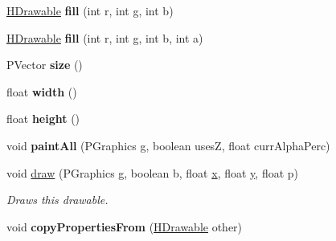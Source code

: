 \begin{DoxyCompactItemize}
\item 
\hypertarget{classhype_1_1drawable_1_1_h_stage_a55c66dfd278df300fcb6c96988dbb4da}{\hyperlink{classhype_1_1drawable_1_1_h_drawable}{H\-Drawable} {\bfseries fill} (int r, int g, int b)}\label{classhype_1_1drawable_1_1_h_stage_a55c66dfd278df300fcb6c96988dbb4da}

\item 
\hypertarget{classhype_1_1drawable_1_1_h_stage_a8ac704c5f91e673b1c7786be8cc398fd}{\hyperlink{classhype_1_1drawable_1_1_h_drawable}{H\-Drawable} {\bfseries fill} (int r, int g, int b, int a)}\label{classhype_1_1drawable_1_1_h_stage_a8ac704c5f91e673b1c7786be8cc398fd}

\item 
\hypertarget{classhype_1_1drawable_1_1_h_stage_a4d1a4833d6ab9bcfdce2f5a0d534d1ef}{P\-Vector {\bfseries size} ()}\label{classhype_1_1drawable_1_1_h_stage_a4d1a4833d6ab9bcfdce2f5a0d534d1ef}

\item 
\hypertarget{classhype_1_1drawable_1_1_h_stage_ae31a077cefbeb64d9d90cf109a3f01d9}{float {\bfseries width} ()}\label{classhype_1_1drawable_1_1_h_stage_ae31a077cefbeb64d9d90cf109a3f01d9}

\item 
\hypertarget{classhype_1_1drawable_1_1_h_stage_a1fb08f04ae51f7e7f223a1f402d59803}{float {\bfseries height} ()}\label{classhype_1_1drawable_1_1_h_stage_a1fb08f04ae51f7e7f223a1f402d59803}

\item 
\hypertarget{classhype_1_1drawable_1_1_h_stage_ae6db64ce43f05d2ccd8483d5ac6fb7b0}{void {\bfseries paint\-All} (P\-Graphics g, boolean uses\-Z, float curr\-Alpha\-Perc)}\label{classhype_1_1drawable_1_1_h_stage_ae6db64ce43f05d2ccd8483d5ac6fb7b0}

\item 
void \hyperlink{classhype_1_1drawable_1_1_h_stage_af831388904234d126dc8f5c4f2c3eb25}{draw} (P\-Graphics g, boolean b, float \hyperlink{classhype_1_1drawable_1_1_h_stage_a28aabd3bca1fdabfa092ebe3c7c3a82d}{x}, float \hyperlink{classhype_1_1drawable_1_1_h_stage_a0cb3ba260c10dc0795441102e575dc7c}{y}, float p)
\begin{DoxyCompactList}\small\item\em Draws this drawable. \end{DoxyCompactList}\item 
\hypertarget{classhype_1_1drawable_1_1_h_stage_a69b751bec2dcc691dd73c88945bb3f84}{void {\bfseries copy\-Properties\-From} (\hyperlink{classhype_1_1drawable_1_1_h_drawable}{H\-Drawable} other)}\label{classhype_1_1drawable_1_1_h_stage_a69b751bec2dcc691dd73c88945bb3f84}


\end{DoxyCompactItemize}
